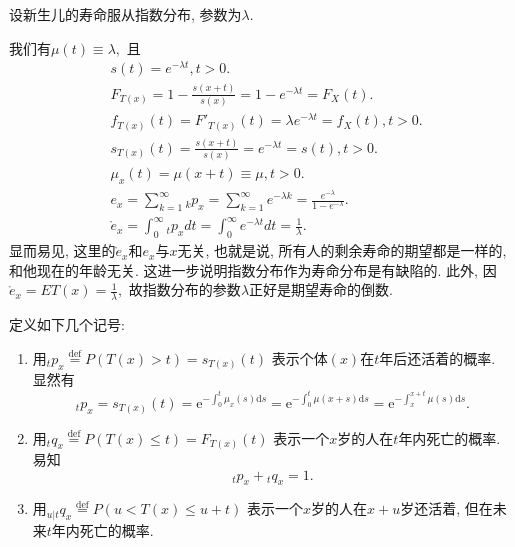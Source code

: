 \documentclass[lang=cn,10pt]{elegantbook}
\begin{document}
\begin{example}
    设新生儿的寿命服从指数分布, 参数为$\lambda$.
\end{example}
\begin{solution}
    我们有$\mu(t)\equiv\lambda,$ 且
    \begin{align*}
         & s(t)=e^{-\lambda t},t>0.                                                                                       \\
         & F_{T(x)}=1-\frac{s(x+t)}{s(x)}=1-e^{- \lambda t}=F_X(t).                                                       \\
         & f_{T(x)}(t)={F'}_{T(x)}(t)=\lambda e^{- \lambda t}=f_X(t),t>0.                                                 \\
         & s_{T(x)}(t)=\frac{s(x+t)}{s(x)}=e^{-\lambda t}=s(t),t>0.                                                       \\
         & \mu_x(t)=\mu(x+t)\equiv\mu,t>0.                                                                                \\
         & e_x = \sum_{k=1}^{\infty} {_kp_x}=\sum_{k=1}^{\infty} {e^{- \lambda k}}=\frac{e^{- \lambda}}{1-e^{- \lambda}}. \\
         & \mathring{e}_x=\int_{0}^{\infty}{_tp_x}dt=\int_{0}^{\infty}{e^{- \lambda t}}dt=\frac{1}{\lambda}.
    \end{align*}
    显而易见, 这里的$\mathring e_x $和$e_x$与$x$无关, 也就是说,  所有人的剩余寿命的期望都是一样的, 和他现在的年龄无关. 这进一步说明指数分布作为寿命分布是有缺陷的.   此外, 因$\mathring{e}_x=ET(x)=\frac{1}{\lambda},$ 故指数分布的参数$\lambda$正好是期望寿命的倒数.
\end{solution}

\begin{proposition}
    定义如下几个记号:
    \begin{enumerate}
        \item 用$_tp_{x}\stackrel{\text{def}}{=}P(T(x)>t)=s_{T(x)}(t)$
              表示个体$(x)$在$t$年后还活着的概率. 显然有
              $$ {}_tp_x=s_{T(x)}(t)=\mathrm{e}^{-\int_{0}^{t}\mu_x(s)\mathrm{d}s}=\mathrm{e}^{-\int_{0}^{t}\mu(x+s)\mathrm{d}s}=\mathrm{e}^{-\int_{x}^{x+t}\mu(s)\mathrm{d}s}.$$
        \item 用$_tq_{x}\stackrel{\text{def}}{=}P(T(x)\leq t)=F_{T(x)}(t)$
              表示一个$x$岁的人在$t$年内死亡的概率. 易知
              $$_tp_{x}+{}_tq_{x}=1.$$
        \item 用$ _{u|t}q_x\stackrel{\text{def}}{=}P(u<T(x)\leq u+t)$
              表示一个$x$岁的人在$x+u$岁还活着, 但在未来$t$年内死亡的概率.
    \end{enumerate}
\end{proposition}
\end{document}
